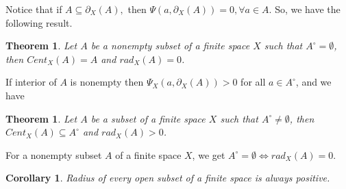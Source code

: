 \documentclass[12pt]{amsart}
\newtheorem{theorem}[definition]{Theorem}
\newtheorem{corollary}[definition]{Corollary}
\begin{document}


Notice that if $A\subseteq\partial_{X}(A),$ then %
$\Psi(a,\partial_{X}(A))=0,\forall a\in A$. %
So,  we have the following result.


\begin{theorem}
Let $A$ be a nonempty subset of a finite space $X$ such that $A^\circ=\emptyset$, then $Cent_{X}(A)=A$ and $rad_{X}(A)=0$.
\end{theorem}

If interior of $A$ is nonempty then $\Psi_X(a,\partial_X(A))>0$ for all $a\in A^\circ$, and we have

\begin{theorem}
Let $A$ be a subset of a finite  space $X$ such that $A^\circ\neq\emptyset$, then $Cent_{X}(A)\subseteq A^\circ$ and $rad_{X}(A)>0$.
\end{theorem}


For a nonempty subset $A$ of a finite  space $X$, we get  $A^\circ=\emptyset \iff rad_{X}(A)=0$.


\begin{corollary}
	Radius of every open subset of a finite space is always positive.
\end{corollary}
\end{document}
